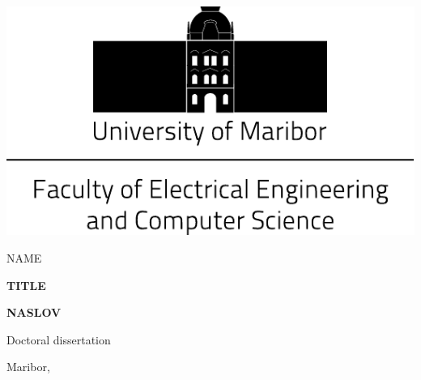 \documentclass[a4paper, twoside, 12pt]{book}
\newcommand\AUTHOR{NAME}
\newcommand\TITLE{TITLE}
\newcommand\NASLOV{NASLOV}
\newcommand\TYPE{Doctoral dissertation}
\begin{document}
\pagestyle{empty}

\begin{titlepage}
\begin{center}
\includegraphics[scale=0.60]{img/logo-um-feri-ang-grayscale.pdf}
\vspace*{\fill}

\begin{Large}
  \AUTHOR\par
\end{Large}
\vspace{10mm}

\begin{large}
  \textbf{\MakeUppercase{\TITLE}}\par
\end{large}
\vspace{10mm}

\begin{large}
  \textbf{\MakeUppercase{\NASLOV}}\par
\end{large}
\vspace{10mm}

\begin{Large}
  \TYPE\par
\end{Large}
\vspace*{\fill}

\begin{Large}
  Maribor,  
\end{Large}

\end{center}
\end{titlepage}
\end{document}

